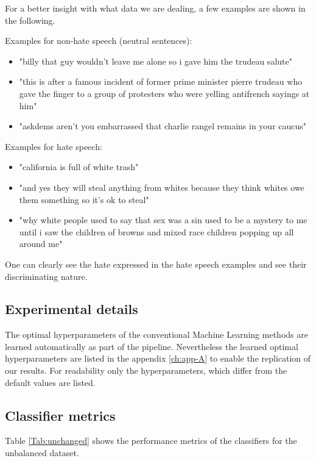 For a better insight with what data we are dealing, a few examples are shown in the following.

\noindent
Examples for non-hate speech (neutral sentences):
\begin{itemize}
    \item "billy that guy wouldn't leave me alone so i gave him the trudeau salute"
    \item "this is after a famous incident of former prime minister pierre trudeau who gave the finger to a group of protesters who were yelling antifrench sayings at him"
    \item "askdems aren't you embarrassed that charlie rangel remains in your caucus"
\end{itemize}

\noindent
Examples for hate speech:
\begin{itemize}
    \item "california is full of white trash"
    \item "and yes they will steal anything from whites because they think whites owe them something so it's ok to steal"
    \item "why white people used to say that sex was a sin used to be a mystery to me until i saw the children of browns and mixed race children popping up all around me"
\end{itemize}

One can clearly see the hate expressed in the hate speech examples and see their discriminating nature.

\subsection{Experimental details}

The optimal hyperparameters of the conventional Machine Learning methods are learned automatically as part of the pipeline. Nevertheless the learned optimal hyperparameters are listed in the appendix \ref{ch:app-A} to enable the replication of our results. For readability only the hyperparameters, which differ from the default values are listed.

\subsection{Classifier metrics}
\label{ch:experimentDc}

Table \ref{Tab:unchanged} shows the performance metrics of the classifiers for the unbalanced dataset. 

